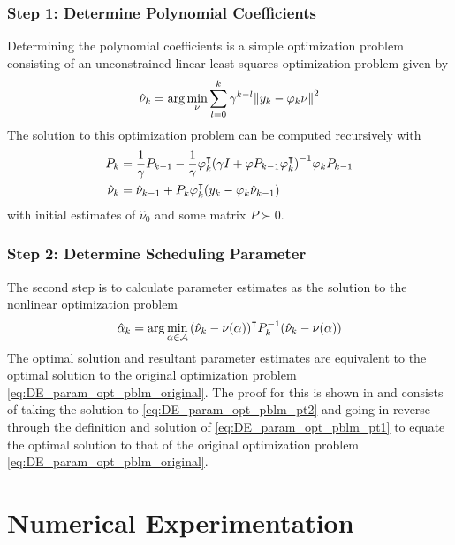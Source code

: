 \documentclass[]{ieeetran}
\begin{document}
\subsubsection{Step 1: Determine Polynomial Coefficients}
Determining the polynomial coefficients is a simple optimization problem consisting of an unconstrained linear least-squares optimization problem given by
\begin{equation}\label{eq:DE_param_opt_pblm_pt1}
	\hat{\nu}_k = \arg \min_\nu \sum_{l=0}^k \gamma^{k-l} \norm{y_k - \varphi_k \nu}^2
\end{equation}
The solution to this optimization problem can be computed recursively with
\begin{subequations}\label{eq:DE_param_opt_pblm_pt1_soln}
	\begin{align}
		P_k &= \frac{1}{\gamma} P_{k-1} - \frac{1}{\gamma} \varphi_k^\intercal \qty(\gamma I + \varphi P_{k-1} \varphi_k^\intercal)^{-1} \varphi_k P_{k-1}\\
		\hat{\nu}_k &= \hat{\nu}_{k-1} + P_k \varphi_k^\intercal \qty(y_k - \varphi_k \hat{\nu}_{k-1})
	\end{align}
\end{subequations}
with initial estimates of $\hat{\nu}_0$ and some matrix $P\succ0$.

\subsubsection{Step 2: Determine Scheduling Parameter}
The second step is to calculate parameter estimates as the solution to the nonlinear optimization problem
\begin{equation}\label{eq:DE_param_opt_pblm_pt2}
	\hat{\alpha}_k = \arg \min_{\alpha\in\mathcal{A}} \qty(\hat{\nu}_k - \nu(\alpha))^\intercal P_k^{-1} \qty(\hat{\nu}_k - \nu(\alpha))
\end{equation}
The optimal solution and resultant parameter estimates are equivalent to the optimal solution to the original optimization problem \eqref{eq:DE_param_opt_pblm_original}. The proof for this is shown in \cite{beelen2017joint} and consists of taking the solution to \eqref{eq:DE_param_opt_pblm_pt2} and going in reverse through the definition and solution of \eqref{eq:DE_param_opt_pblm_pt1} to equate the optimal solution to that of the original optimization problem \eqref{eq:DE_param_opt_pblm_original}.



\section{Numerical Experimentation}
\end{document}
